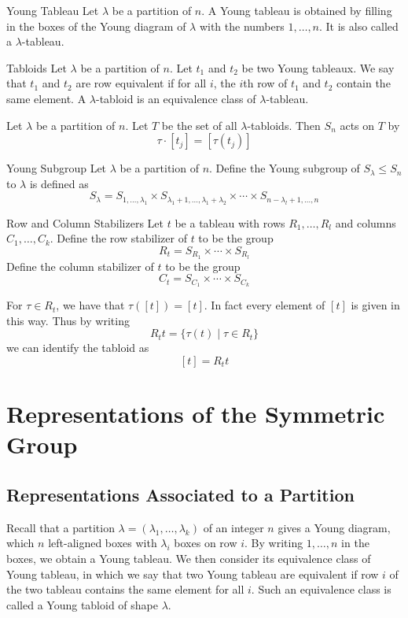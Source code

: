 \documentclass[a4paper]{article}
\begin{document}
\begin{defn}{Young Tableau}{} Let $\lambda$ be a partition of $n$. A Young tableau is obtained by filling in the boxes of the Young diagram of $\lambda$ with the numbers $1,\dots,n$. It is also called a $\lambda$-tableau. 
\end{defn}

\begin{defn}{Tabloids}{} Let $\lambda$ be a partition of $n$. Let $t_1$ and $t_2$ be two Young tableaux. We say that $t_1$ and $t_2$ are row equivalent if for all $i$, the $i$th row of $t_1$ and $t_2$ contain the same element. A $\lambda$-tabloid is an equivalence class of $\lambda$-tableau. 
\end{defn}

\begin{prp}{}{} Let $\lambda$ be a partition of $n$. Let $T$ be the set of all $\lambda$-tabloids. Then $S_n$ acts on $T$ by $$\tau\cdot[t_j]=[\tau(t_j)]$$
\end{prp}

\begin{defn}{Young Subgroup}{} Let $\lambda$ be a partition of $n$. Define the Young subgroup of $S_\lambda\leq S_n$ to $\lambda$ is defined as $$S_\lambda=S_{1,\dots,\lambda_1}\times S_{\lambda_1+1,\dots,\lambda_1+\lambda_2}\times\cdots\times S_{n-\lambda_l+1,\dots,n}$$
\end{defn}

\begin{defn}{Row and Column Stabilizers}{} Let $t$ be a tableau with rows $R_1,\dots,R_l$ and columns $C_1,\dots,C_k$. Define the row stabilizer of $t$ to be the group $$R_t=S_{R_1}\times\cdots\times S_{R_l}$$ Define the column stabilizer of $t$ to be the group $$C_t=S_{C_1}\times\cdots\times S_{C_k}$$
\end{defn}

For $\tau\in R_t$, we have that $\tau([t])=[t]$. In fact every element of $[t]$ is given in this way. Thus by writing $$R_tt=\{\tau(t)\;|\;\tau\in R_t\}$$ we can identify the tabloid as $$[t]=R_tt$$


\pagebreak
\section{Representations of the Symmetric Group}
\subsection{Representations Associated to a Partition}
Recall that a partition $\lambda=(\lambda_1,\dots,\lambda_k)$ of an integer $n$ gives a Young diagram, which $n$ left-aligned boxes with $\lambda_i$ boxes on row $i$. By writing $1,\dots,n$ in the boxes, we obtain a Young tableau. We then consider its equivalence class of Young tableau, in which we say that two Young tableau are equivalent if row $i$ of the two tableau contains the same element for all $i$. Such an equivalence class is called a Young tabloid of shape $\lambda$. \\~\\
\end{document}
